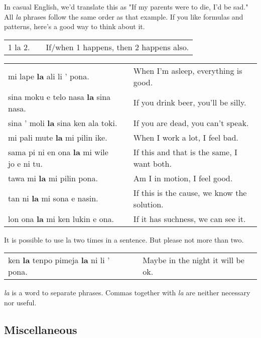 In casual English, we'd translate this as "If my parents were to die, I'd be sad." 
All \textit{la} phrases follow the same order as that example. 
If you like formulas and patterns, here's a good way to think about it. 

\begin{supertabular}{p{5,5cm}|ll}
1 la 2. && If/when 1 happens, then 2 happens also. \\  %
\end{supertabular} 

\begin{supertabular}{p{5,5cm}|ll}
mi lape \textbf{la} ali li ' pona. && When I'm asleep, everything is good. \\
sina moku e telo nasa \textbf{la} sina nasa. && If you drink beer, you'll be silly. \\
sina ' moli \textbf{la} sina ken ala toki. && If you are dead, you can't speak. \\
mi pali mute \textbf{la} mi pilin ike. && When I work a lot, I feel bad. \\
sama pi ni en ona \textbf{la} mi wile jo e ni tu. &&  If this and that is the same, I want both.\\
tawa mi \textbf{la} mi pilin pona. && Am I in motion, I feel good. \\
tan ni \textbf{la} mi sona e nasin. && If this is the cause, we know the solution. \\
lon ona \textbf{la} mi ken lukin e ona. && If it has suchness, we can see it. \\
\end{supertabular} 

It is possible to use la two times in a sentence. But please not more than two. 

\begin{supertabular}{p{5,5cm}|ll}
ken \textbf{la} tenpo pimeja \textbf{la} ni li ' pona. && Maybe in the night it will be ok. \\  
\end{supertabular} 

\textit{la} is a word to separate phrases. Commas together with \textit{la} are neither necessary nor useful. 
%
\subsection*{Miscellaneous}
